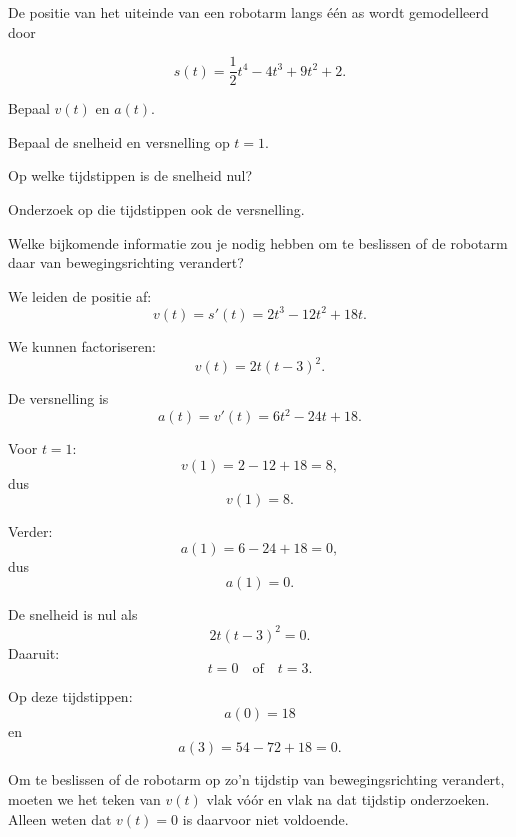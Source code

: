 \documentclass{ximera}
\begin{document}

\begin{oefening}{\oefG}

De positie van het uiteinde van een robotarm langs één as wordt
gemodelleerd door

\[
s(t)=\frac12t^4-4t^3+9t^2+2.
\]

\begin{question}
Bepaal $v(t)$ en $a(t)$.
\end{question}

\begin{question}
Bepaal de snelheid en versnelling op $t=1$.
\end{question}

\begin{question}
Op welke tijdstippen is de snelheid nul?
\end{question}

\begin{question}
Onderzoek op die tijdstippen ook de versnelling.
\end{question}

\begin{question}
Welke bijkomende informatie zou je nodig hebben om te beslissen of
de robotarm daar van bewegingsrichting verandert?
\end{question}

\begin{oplossing}

We leiden de positie af:
\[
v(t)=s'(t)=2t^3-12t^2+18t.
\]

We kunnen factoriseren:
\[
\boxed{v(t)=2t(t-3)^2}.
\]

De versnelling is
\[
a(t)=v'(t)=6t^2-24t+18.
\]

Voor $t=1$:
\[
v(1)=2-12+18=8,
\]
dus
\[
\boxed{v(1)=8}.
\]

Verder:
\[
a(1)=6-24+18=0,
\]
dus
\[
\boxed{a(1)=0}.
\]

De snelheid is nul als
\[
2t(t-3)^2=0.
\]
Daaruit:
\[
\boxed{t=0\quad\text{of}\quad t=3}.
\]

Op deze tijdstippen:
\[
a(0)=18
\]
en
\[
a(3)=54-72+18=0.
\]

Om te beslissen of de robotarm op zo'n tijdstip van bewegingsrichting
verandert, moeten we het teken van $v(t)$ vlak vóór en vlak na dat tijdstip
onderzoeken. Alleen weten dat $v(t)=0$ is daarvoor niet voldoende.

\end{oplossing}

\end{oefening}
\end{document}
